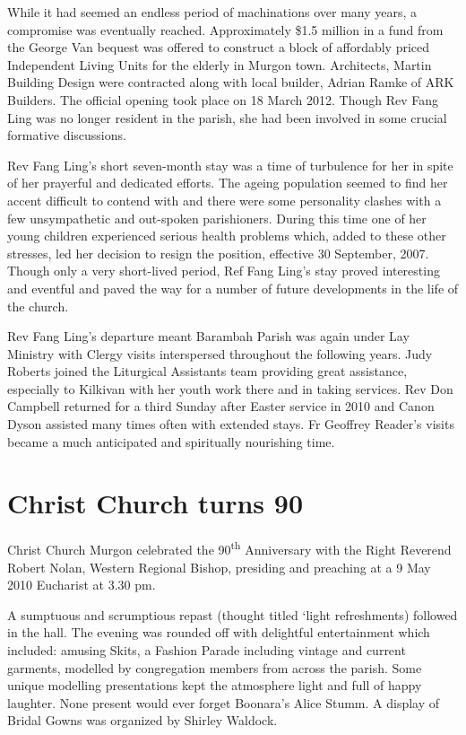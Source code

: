 While it had seemed an endless period of machinations over many years, a compromise was eventually reached. Approximately \$1.5 million in a fund from the George Van bequest was offered to construct a block of affordably priced Independent Living Units for the elderly in Murgon town. Architects, Martin Building Design were contracted along with local builder, Adrian Ramke of ARK Builders. The official opening took place on 18 March 2012. Though Rev Fang Ling was no longer resident in the parish, she had been involved in some crucial formative discussions.



Rev Fang Ling's short seven-month stay was a time of turbulence for her in spite of her prayerful and dedicated efforts. The ageing population seemed to find her accent difficult to contend with and there were some personality clashes with a few unsympathetic and out-spoken parishioners. During this time one of her young children experienced serious health problems which, added to these other stresses, led her decision to resign the position, effective 30 September, 2007. Though only a very short-lived period, Ref Fang Ling's stay proved interesting and eventful and paved the way for a number of future developments in the life of the church.



Rev Fang Ling's departure meant Barambah Parish was again under Lay Ministry with Clergy visits interspersed throughout the following years. Judy Roberts joined the Liturgical Assistants team providing great assistance, especially to Kilkivan with her youth work there and in taking services. Rev Don Campbell returned for a third Sunday after Easter service in 2010 and Canon Dyson assisted many times often with extended stays. Fr Geoffrey Reader's visits became a much anticipated and spiritually nourishing time.



\section{Christ Church turns 90}



Christ Church Murgon celebrated the 90\textsuperscript{th} Anniversary with the Right Reverend Robert Nolan, Western Regional Bishop, presiding and preaching at a 9 May 2010 Eucharist at 3.30 pm.



A sumptuous and scrumptious repast (thought titled `light refreshments) followed in the hall. The evening was rounded off with delightful entertainment which included: amusing Skits, a Fashion Parade including vintage and current garments, modelled by congregation members from across the parish. Some unique modelling presentations kept the atmosphere light and full of happy laughter. None present would ever forget Boonara's Alice Stumm. A display of Bridal Gowns was organized by Shirley Waldock.



